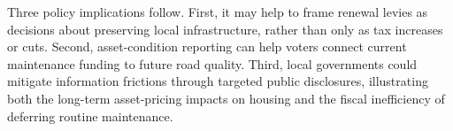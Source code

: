 Three policy implications follow. First, it may help to frame renewal levies as decisions about preserving local infrastructure, rather than only as tax increases or cuts. Second, asset-condition reporting can help voters connect current maintenance funding to future road quality. 
Third, local governments could mitigate information frictions through targeted public disclosures, illustrating both the long-term asset-pricing impacts on housing and the fiscal inefficiency of deferring routine maintenance.





